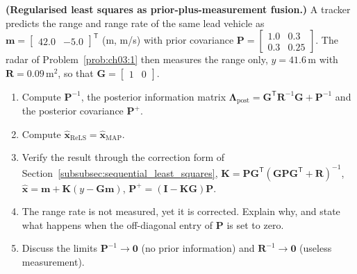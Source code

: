 \documentclass[graybox,envcountchap]{style/SNmono}
\begin{document}
\begin{prob}\label{prob:ch03:2}
\textbf{(Regularised least squares as prior-plus-measurement fusion.)} A tracker predicts the range and range rate of the same lead vehicle as $\mathbf{m}=\begin{bmatrix}42.0 & -5.0\end{bmatrix}^{\mathsf T}$ (m, m/s) with prior covariance
$\mathbf{P}=\begin{bmatrix}1.0&0.3\\0.3&0.25\end{bmatrix}$.
The radar of Problem~\ref{prob:ch03:1} then measures the range only, $y=41.6$\,m with $\mathbf{R}=0.09$\,m$^{2}$, so that $\mathbf{G}=\begin{bmatrix}1&0\end{bmatrix}$.
\begin{enumerate}
\item[(a)] Compute $\mathbf{P}^{-1}$, the posterior information matrix $\mathbf{\Lambda}_{\mathrm{post}}=\mathbf{G}^{\mathsf T}\mathbf{R}^{-1}\mathbf{G}+\mathbf{P}^{-1}$ and the posterior covariance $\mathbf{P}^{+}$.
\item[(b)] Compute $\widehat{\mathbf{x}}_{\mathrm{ReLS}}=\widehat{\mathbf{x}}_{\mathrm{MAP}}$.
\item[(c)] Verify the result through the correction form of Section~\ref{subsubsec:sequential_least_squares}, $\mathbf{K}=\mathbf{P}\mathbf{G}^{\mathsf T}(\mathbf{G}\mathbf{P}\mathbf{G}^{\mathsf T}+\mathbf{R})^{-1}$, $\widehat{\mathbf{x}}=\mathbf{m}+\mathbf{K}(y-\mathbf{G}\mathbf{m})$, $\mathbf{P}^{+}=(\mathbf{I}-\mathbf{K}\mathbf{G})\mathbf{P}$.
\item[(d)] The range rate is not measured, yet it is corrected. Explain why, and state what happens when the off-diagonal entry of $\mathbf{P}$ is set to zero.
\item[(e)] Discuss the limits $\mathbf{P}^{-1}\to\mathbf{0}$ (no prior information) and $\mathbf{R}^{-1}\to\mathbf{0}$ (useless measurement).
\end{enumerate}
\end{prob}
\end{document}
